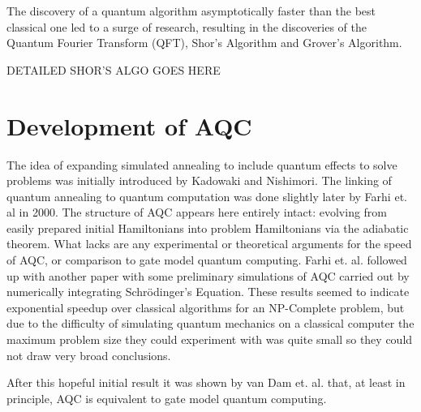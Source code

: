 The discovery of a quantum algorithm asymptotically faster than the best classical one led to a surge of research, resulting in the discoveries of the Quantum Fourier Transform (QFT)\cite{qcbook}, Shor's\cite{shor} Algorithm and Grover's Algorithm\cite{grover}.

DETAILED SHOR'S ALGO GOES HERE

\section{Development of AQC}
The idea of expanding simulated annealing to include quantum effects to solve problems was initially introduced by Kadowaki and Nishimori.\cite{transverse}  The linking of quantum annealing to quantum computation was done slightly later by Farhi et. al in 2000.\cite{farhi}  The structure of AQC appears here entirely intact: evolving from easily prepared initial Hamiltonians into problem Hamiltonians via the adiabatic theorem.  What \cite{farhi} lacks are any experimental or theoretical arguments for the speed of AQC, or comparison to gate model quantum computing.  Farhi et. al. followed up with another paper\cite{farhi2} with some preliminary simulations of AQC carried out by numerically integrating Schr\"odinger's Equation.  These results seemed to indicate exponential speedup over classical algorithms for an NP-Complete problem, but due to the difficulty of simulating quantum mechanics on a classical computer the maximum problem size they could experiment with was quite small so they could not draw very broad conclusions.

After this hopeful initial result it was shown by van Dam et. al.\cite{vandam} that, at least in principle, AQC is equivalent to gate model quantum computing. 
